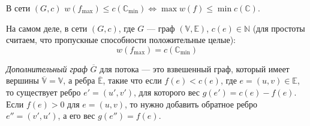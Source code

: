 \documentclass[russian]{lecture-notes}
\begin{document}
	\begin{corollary}
		В сети $(G,c)$ $w(f_{\max}) \leq c(\mathbb{C}_{\min}) \Leftrightarrow \max w(f) \leq \min c(\mathbb{C})$.
	\end{corollary}
	
	\begin{theorem}
		На самом деле, в сети $(G,c)$, где $G$ --- граф $(\mathbb{V},\mathbb{E})$, $c(e) \in \mathbb{N}$ (для простоты считаем, что пропускные способности положительные целые):
		$$w(f_{\max}) = c(\mathbb{C}_{\min})$$
	\end{theorem}
	
	\begin{definition}
		\textit{Дополнительный граф} $\overline G$ для потока --- это взвешенный граф, который имеет вершины $\overline {\mathbb{V}} = \mathbb{V}$, а ребра $\overline {\mathbb{E}}$, такие что если $f(e) < c(e)$, где $e = (u,v) \in \mathbb{E}$, то существует ребро $e' = (u', v')$, для которого вес $g(e') = c(e) - f(e)$. Если $f(e) > 0$ для $e=(u,v)$, то нужно добавить обратное ребро $e'' = (v', u')$, а его вес $g(e'') = f(e)$.
	\end{definition}
\end{document}

